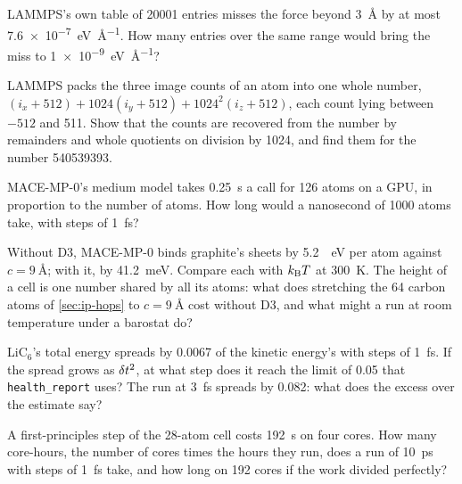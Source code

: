 \begin{exercise}
\label{ex:ip-table-points}
LAMMPS's own table of \num{20001} entries misses the force beyond
\SI{3}{\angstrom} by at most \SI{7.6e-7}{\electronvolt\per\angstrom}. How
many entries over the same range would bring the miss to
\SI{1e-9}{\electronvolt\per\angstrom}?
\end{exercise}

\begin{exercise}
\label{ex:ip-images}
LAMMPS packs the three image counts of an atom into one whole number,
$(i_x + 512) + 1024(i_y + 512) + 1024^2(i_z + 512)$, each count lying
between $-512$ and 511. Show that the counts are recovered from the
number by remainders and whole quotients on division by 1024, and find
them for the number \num{540539393}.
\end{exercise}

\begin{exercise}
\label{ex:ip-cost}
MACE-MP-0's medium model takes \SI{0.25}{\second} a call for 126 atoms on
a GPU, in proportion to the number of atoms. How long would a nanosecond
of 1000 atoms take, with steps of \SI{1}{\femto\second}?
\end{exercise}

\begin{exercise}
\label{ex:ip-d3}
Without D3, MACE-MP-0 binds graphite's sheets by \SI{5.2}{\milli
\electronvolt} per atom against $c = \SI{9}{\angstrom}$; with it, by
\SI{41.2}{\milli\electronvolt}. Compare each with $k_{\mathrm{B}} T$ at
\SI{300}{\kelvin}. The height of a cell is one number shared by all its
atoms: what does stretching the 64 carbon atoms of \cref{sec:ip-hops} to
$c = \SI{9}{\angstrom}$ cost without D3, and what might a run at room
temperature under a barostat do?
\end{exercise}

\begin{exercise}
\label{ex:ip-step}
LiC$_6$'s total energy spreads by 0.0067 of the kinetic energy's with steps
of \SI{1}{\femto\second}. If the spread grows as $\delta t^2$, at what step
does it reach the limit of 0.05 that \texttt{health\_report} uses? The
run at \SI{3}{\femto\second} spreads by 0.082: what does the excess over
the estimate say?
\end{exercise}

\begin{exercise}
\label{ex:ip-aimd-cost}
A first-principles step of the 28-atom cell costs \SI{192}{\second} on four
cores. How many core-hours, the number of cores times the hours they
run, does a run of \SI{10}{\pico\second} with steps of
\SI{1}{\femto\second} take, and how long on 192 cores if the work divided
perfectly?
\end{exercise}

